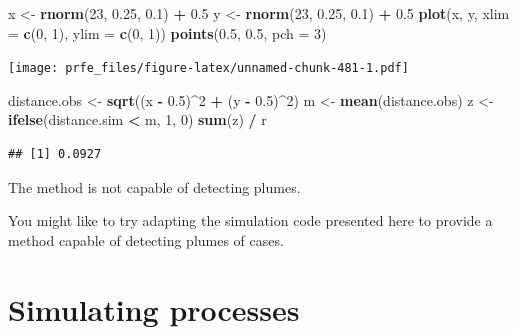 \documentclass[12pt,a4paper]{book}
\newenvironment{Shaded}{\begin{snugshade}}{\end{snugshade}}
\newcommand{\KeywordTok}[1]{\textcolor[rgb]{0.13,0.29,0.53}{\textbf{#1}}}
\newcommand{\DataTypeTok}[1]{\textcolor[rgb]{0.13,0.29,0.53}{#1}}
\newcommand{\DecValTok}[1]{\textcolor[rgb]{0.00,0.00,0.81}{#1}}
\newcommand{\FloatTok}[1]{\textcolor[rgb]{0.00,0.00,0.81}{#1}}
\newcommand{\StringTok}[1]{\textcolor[rgb]{0.31,0.60,0.02}{#1}}
\newcommand{\OperatorTok}[1]{\textcolor[rgb]{0.81,0.36,0.00}{\textbf{#1}}}
\newcommand{\NormalTok}[1]{#1}
\theoremstyle{definition}
\theoremstyle{definition}
\theoremstyle{definition}
\theoremstyle{remark}
\begin{document}
\begin{Shaded}
\begin{Highlighting}[]
\NormalTok{x <-}\StringTok{ }\KeywordTok{rnorm}\NormalTok{(}\DecValTok{23}\NormalTok{, }\FloatTok{0.25}\NormalTok{, }\FloatTok{0.1}\NormalTok{) }\OperatorTok{+}\StringTok{ }\FloatTok{0.5}
\NormalTok{y <-}\StringTok{ }\KeywordTok{rnorm}\NormalTok{(}\DecValTok{23}\NormalTok{, }\FloatTok{0.25}\NormalTok{, }\FloatTok{0.1}\NormalTok{) }\OperatorTok{+}\StringTok{ }\FloatTok{0.5}
\KeywordTok{plot}\NormalTok{(x, y, }\DataTypeTok{xlim =} \KeywordTok{c}\NormalTok{(}\DecValTok{0}\NormalTok{, }\DecValTok{1}\NormalTok{), }\DataTypeTok{ylim =} \KeywordTok{c}\NormalTok{(}\DecValTok{0}\NormalTok{, }\DecValTok{1}\NormalTok{))}
\KeywordTok{points}\NormalTok{(}\FloatTok{0.5}\NormalTok{, }\FloatTok{0.5}\NormalTok{, }\DataTypeTok{pch =} \DecValTok{3}\NormalTok{)}
\end{Highlighting}
\end{Shaded}

\texttt{[image: prfe\_files/figure-latex/unnamed-chunk-481-1.pdf]}

\begin{Shaded}
\begin{Highlighting}[]
\NormalTok{distance.obs <-}\StringTok{ }\KeywordTok{sqrt}\NormalTok{((x }\OperatorTok{-}\StringTok{ }\FloatTok{0.5}\NormalTok{)}\OperatorTok{^}\DecValTok{2} \OperatorTok{+}\StringTok{ }\NormalTok{(y }\OperatorTok{-}\StringTok{ }\FloatTok{0.5}\NormalTok{)}\OperatorTok{^}\DecValTok{2}\NormalTok{)}
\NormalTok{m <-}\StringTok{ }\KeywordTok{mean}\NormalTok{(distance.obs)}
\NormalTok{z <-}\StringTok{ }\KeywordTok{ifelse}\NormalTok{(distance.sim }\OperatorTok{<}\StringTok{ }\NormalTok{m, }\DecValTok{1}\NormalTok{, }\DecValTok{0}\NormalTok{)}
\KeywordTok{sum}\NormalTok{(z) }\OperatorTok{/}\StringTok{ }\NormalTok{r}
\end{Highlighting}
\end{Shaded}

\begin{verbatim}
## [1] 0.0927
\end{verbatim}

The method is not capable of detecting plumes.

You might like to try adapting the simulation code presented here to
provide a method capable of detecting plumes of cases.

\hypertarget{simulating-processes}{%
\section{Simulating processes}\label{simulating-processes}}
\end{document}
